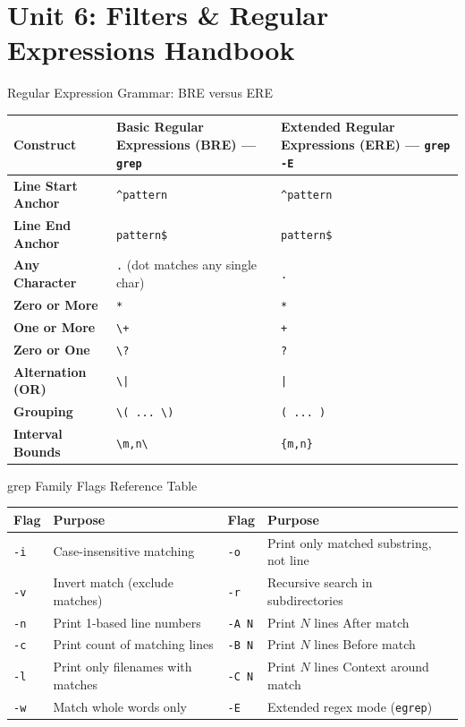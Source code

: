 \chapter{Unit 6: Filters \& Regular Expressions Handbook}

\begin{cheatbox}{Regular Expression Grammar: BRE versus ERE}
\begin{tabularx}{\linewidth}{l X X}
\toprule
\textbf{Construct} & \textbf{Basic Regular Expressions (BRE) --- \texttt{grep}} & \textbf{Extended Regular Expressions (ERE) --- \texttt{grep -E}} \\
\midrule
\textbf{Line Start Anchor} & \texttt{\^{}pattern} & \texttt{\^{}pattern} \\
\textbf{Line End Anchor} & \texttt{pattern\$} & \texttt{pattern\$} \\
\textbf{Any Character} & \texttt{.} (dot matches any single char) & \texttt{.} \\
\textbf{Zero or More} & \texttt{*} & \texttt{*} \\
\textbf{One or More} & \texttt{\textbackslash+} & \texttt{+} \\
\textbf{Zero or One} & \texttt{\textbackslash?} & \texttt{?} \\
\textbf{Alternation (OR)} & \texttt{\textbackslash|} & \texttt{|} \\
\textbf{Grouping} & \texttt{\textbackslash( ... \textbackslash)} & \texttt{( ... )} \\
\textbf{Interval Bounds} & \texttt{\textbackslash{m,n\textbackslash}} & \texttt{\{m,n\}} \\
\bottomrule
\end{tabularx}
\end{cheatbox}

\begin{syntaxbox}{grep Family Flags Reference Table}
\begin{tabularx}{\linewidth}{l X l X}
\toprule
\textbf{Flag} & \textbf{Purpose} & \textbf{Flag} & \textbf{Purpose} \\
\midrule
\texttt{-i} & Case-insensitive matching & \texttt{-o} & Print only matched substring, not line \\
\texttt{-v} & Invert match (exclude matches) & \texttt{-r} & Recursive search in subdirectories \\
\texttt{-n} & Print 1-based line numbers & \texttt{-A N} & Print $N$ lines After match \\
\texttt{-c} & Print count of matching lines & \texttt{-B N} & Print $N$ lines Before match \\
\texttt{-l} & Print only filenames with matches & \texttt{-C N} & Print $N$ lines Context around match \\
\texttt{-w} & Match whole words only & \texttt{-E} & Extended regex mode (\texttt{egrep}) \\
\bottomrule
\end{tabularx}
\end{syntaxbox}

